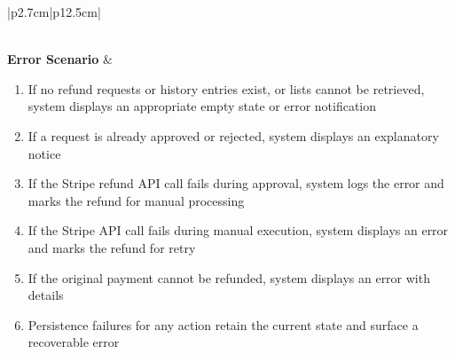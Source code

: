 \begin{table}[H]
\begin{tabular}{|p{2.7cm}|p{12.5cm}|}
\begin{minipage}[t]{\linewidth}
\begin{enumerate}[topsep=0pt,itemsep=1pt,parsep=0pt,partopsep=0pt]
            \end{enumerate}
        \end{minipage} \\
        \hline
        \textbf{Error Scenario} & \begin{minipage}[t]{\linewidth}
            \begin{enumerate}[topsep=0pt,itemsep=1pt,parsep=0pt,partopsep=0pt]
                \item If no refund requests or history entries exist, or lists cannot be retrieved, system displays an appropriate empty state or error notification
                \item If a request is already approved or rejected, system displays an explanatory notice
                \item If the Stripe refund API call fails during approval, system logs the error and marks the refund for manual processing
                \item If the Stripe API call fails during manual execution, system displays an error and marks the refund for retry
                \item If the original payment cannot be refunded, system displays an error with details
                \item Persistence failures for any action retain the current state and surface a recoverable error
            \end{enumerate}
        \end{minipage} \\
        \hline
    \end{tabular}
    \label{tab:admin-refund-requests}
\end{table}


